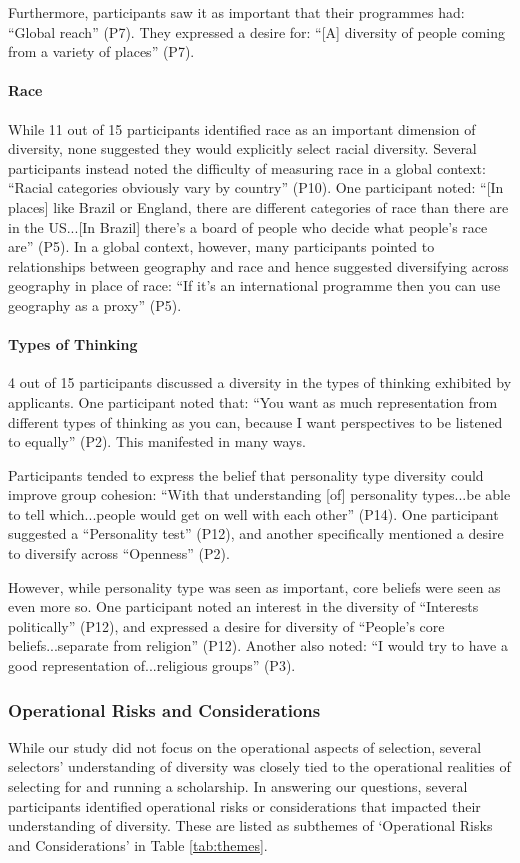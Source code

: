 Furthermore, participants saw it as important that their programmes had: ``Global reach'' (P7). They expressed a desire for: ``[A] diversity of people coming from a variety of places'' (P7).

\paragraph{Race}
While 11 out of 15 participants identified race as an important dimension of diversity, none suggested they would explicitly select racial diversity. Several participants instead noted the difficulty of measuring race in a global context: ``Racial categories obviously vary by country'' (P10). One participant noted: ``[In places] like Brazil or England, there are different categories of race than there are in the US...[In Brazil] there's a board of people who decide what people's race are'' (P5). In a global context, however, many participants pointed to relationships between geography and race and hence suggested diversifying across geography in place of race: ``If it's an international programme then you can use geography as a proxy'' (P5).

\paragraph{Types of Thinking}
4 out of 15 participants discussed a diversity in the types of thinking exhibited by applicants. One participant noted that: ``You want as much representation from different types of thinking as you can, because I want perspectives to be listened to equally'' (P2). This manifested in many ways.

Participants tended to express the belief that personality type diversity could improve group cohesion: ``With that understanding [of] personality types...be able to tell which...people would get on well with each other'' (P14). One participant suggested a ``Personality test'' (P12), and another specifically mentioned a desire to diversify across ``Openness'' (P2).

However, while personality type was seen as important, core beliefs were seen as even more so. One participant noted an interest in the diversity of ``Interests politically'' (P12), and expressed a desire for diversity of ``People's core beliefs...separate from religion'' (P12). Another also noted: ``I would try to have a good representation of...religious groups'' (P3).

\subsubsection{Operational Risks and Considerations}
While our study did not focus on the operational aspects of selection, several selectors' understanding of diversity was closely tied to the operational realities of selecting for and running a scholarship. In answering our questions, several participants identified operational risks or considerations that impacted their understanding of diversity. These are listed as subthemes of `Operational Risks and Considerations' in Table \ref{tab:themes}.

